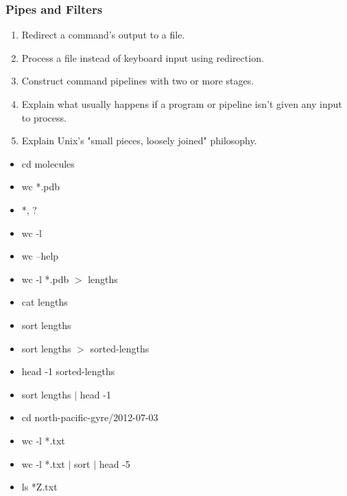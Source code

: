 \documentclass[xcolor=dvipsnames]{beamer}
\begin{document}
\begin{frame}
\frametitle{Pipes and Filters}
\begin{enumerate}

\item    Redirect a command's output to a file.
\item    Process a file instead of keyboard input using redirection.
\item    Construct command pipelines with two or more stages.
\item    Explain what usually happens if a program or pipeline isn't given any input to process.
\item    Explain Unix's "small pieces, loosely joined" philosophy.

\end{enumerate}
\begin{multicols}{2}
\begin{itemize}
\item cd molecules
\item wc *.pdb
\item *, ? 
\item wc -l
\item wc --help
\item wc -l *.pdb $>$ lengths
\item cat lengths
\item sort lengths
\item sort lengths $>$ sorted-lengths
\item head -1 sorted-lengths
\item sort lengths $|$ head -1
\item cd north-pacific-gyre/2012-07-03
\item wc -l *.txt 
\item wc -l *.txt $|$ sort $|$ head -5
\item ls *Z.txt
\end{itemize}
\end{multicols}
\end{frame}
\end{document}

